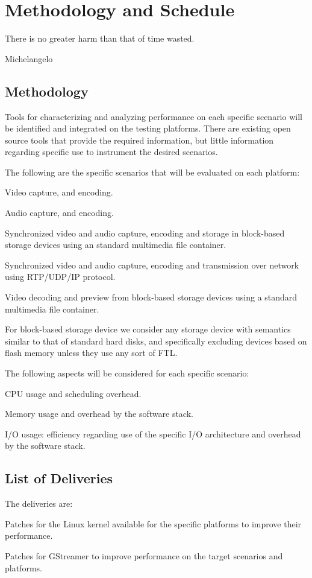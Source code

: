 \chapter{Methodology and Schedule} 
\epigraph{There is no greater harm than that of time wasted.}{Michelangelo}

\section{Methodology}
Tools for characterizing and analyzing performance on each specific scenario will be identified and integrated on the testing platforms. There are existing open source tools that provide the required information, but little information regarding specific use to instrument the desired scenarios.

The following are the specific scenarios that will be evaluated on each platform:
\begin{itemize*}
\item Video capture, and encoding.
\item Audio capture, and encoding.
\item Synchronized video and audio capture, encoding and storage in block-based storage devices using an standard multimedia file container.
\item Synchronized video and audio capture, encoding and transmission over network using RTP/UDP/IP protocol.
\item Video decoding and preview from block-based storage devices using a standard multimedia file container.
\end{itemize*}

For block-based storage device we consider any storage device with semantics similar to that of standard hard disks, and specifically excluding devices based on flash memory unless they use any sort of \ac{FTL}.

The following aspects will be considered for each specific scenario:
\begin{itemize*}
\item CPU usage and scheduling overhead.
\item Memory usage and overhead by the software stack.
\item I/O usage: efficiency regarding use of the specific I/O architecture and overhead by the software stack.
\end{itemize*}

\section{List of Deliveries}
The deliveries are:
\begin{enumerate*}
\item Patches for the Linux kernel available for the specific platforms to improve their performance.
\item Patches for GStreamer to improve performance on the target scenarios and platforms.
\end{enumerate*}

